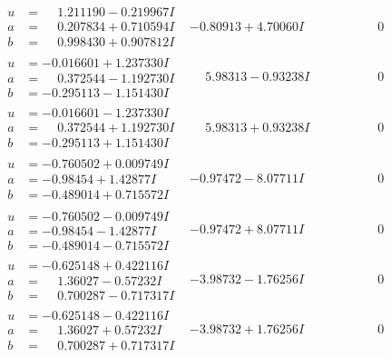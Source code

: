 \documentclass[1p]{elsarticle_modified}
\theoremstyle{definition}
\begin{document}
$$\begin{array}{c|c|c}
\begin{aligned}
u &= \phantom{-}1.211190 - 0.219967 I \\
a &= \phantom{-}0.207834 + 0.710594 I \\
b &= \phantom{-}0.998430 + 0.907812 I\end{aligned}
 & -0.80913 + 4.70060 I & \phantom{-0.000000 } 0 \\ \hline\begin{aligned}
u &= -0.016601 + 1.237330 I \\
a &= \phantom{-}0.372544 - 1.192730 I \\
b &= -0.295113 - 1.151430 I\end{aligned}
 & \phantom{-}5.98313 - 0.93238 I & \phantom{-0.000000 } 0 \\ \hline\begin{aligned}
u &= -0.016601 - 1.237330 I \\
a &= \phantom{-}0.372544 + 1.192730 I \\
b &= -0.295113 + 1.151430 I\end{aligned}
 & \phantom{-}5.98313 + 0.93238 I & \phantom{-0.000000 } 0 \\ \hline\begin{aligned}
u &= -0.760502 + 0.009749 I \\
a &= -0.98454 + 1.42877 I \\
b &= -0.489014 + 0.715572 I\end{aligned}
 & -0.97472 - 8.07711 I & \phantom{-0.000000 } 0 \\ \hline\begin{aligned}
u &= -0.760502 - 0.009749 I \\
a &= -0.98454 - 1.42877 I \\
b &= -0.489014 - 0.715572 I\end{aligned}
 & -0.97472 + 8.07711 I & \phantom{-0.000000 } 0 \\ \hline\begin{aligned}
u &= -0.625148 + 0.422116 I \\
a &= \phantom{-}1.36027 - 0.57232 I \\
b &= \phantom{-}0.700287 - 0.717317 I\end{aligned}
 & -3.98732 - 1.76256 I & \phantom{-0.000000 } 0 \\ \hline\begin{aligned}
u &= -0.625148 - 0.422116 I \\
a &= \phantom{-}1.36027 + 0.57232 I \\
b &= \phantom{-}0.700287 + 0.717317 I\end{aligned}
 & -3.98732 + 1.76256 I & \phantom{-0.000000 } 0 \\ \hline\begin{aligned}

\end{aligned}
\end{array}$$
\end{document}
